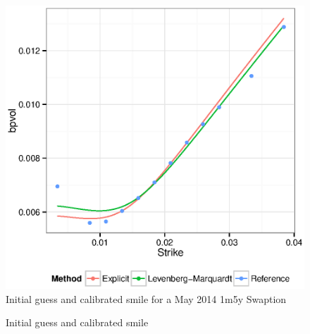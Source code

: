 \documentclass[]{rAMF2e}
\begin{document}
\begin{figure}[h!]
  \caption{\label{fig:explicit_fit_1m_beta05}Initial guess and calibrated smile for a May 2014 1m5y Swaption }
\begin{center}
 \includegraphics[width=12cm]{explicit_fit_1m_beta05.eps}
\end{center}
\end{figure}

\begin{figure}[htb]
  \begin{center}  
  \end{center}
     \caption{Initial guess and calibrated smile}
\end{figure}
\end{document}
